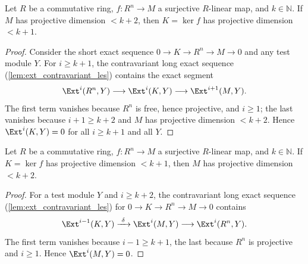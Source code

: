 \begin{lemma}
  \label{lem:syzygy_descent}
  \leanok
  Let \(R\) be a commutative ring, \(f : R^n \to M\) a surjective \(R\)-linear map, and
  \(k \in \mathbb{N}\). If \(M\) has projective dimension \(< k + 2\), then
  \(K = \ker f\) has projective dimension \(< k + 1\).
\end{lemma}
\begin{proof}
  \leanok
  Consider the short exact sequence \(0 \to K \to R^n \to M \to 0\) and any test module
  \(Y\). For \(i \geq k + 1\), the contravariant long exact sequence
  (\ref{lem:ext_contravariant_les}) contains the exact segment
  \[
    \Ext^i(R^n, Y) \longrightarrow \Ext^i(K, Y) \longrightarrow \Ext^{i+1}(M, Y).
  \]
  The first term vanishes because \(R^n\) is free, hence projective, and \(i \geq 1\);
  the last vanishes because \(i + 1 \geq k + 2\) and \(M\) has projective dimension
  \(< k+2\). Hence \(\Ext^i(K, Y) = 0\) for all \(i \geq k+1\) and all \(Y\).
\end{proof}

\begin{lemma}
  \label{lem:syzygy_ascent}
  \leanok
  Let \(R\) be a commutative ring, \(f : R^n \to M\) a surjective \(R\)-linear map, and
  \(k \in \mathbb{N}\). If \(K = \ker f\) has projective dimension \(< k + 1\), then
  \(M\) has projective dimension \(< k + 2\).
\end{lemma}
\begin{proof}
  \leanok
  For a test module \(Y\) and \(i \geq k + 2\), the contravariant long exact sequence
  (\ref{lem:ext_contravariant_les}) for \(0 \to K \to R^n \to M \to 0\) contains
  \[
    \Ext^{i-1}(K, Y) \xrightarrow{\ \delta\ } \Ext^{i}(M, Y) \longrightarrow
      \Ext^{i}(R^n, Y).
  \]
  The first term vanishes because \(i - 1 \geq k + 1\), the last because \(R^n\) is
  projective and \(i \geq 1\). Hence \(\Ext^i(M, Y) = 0\).
\end{proof}

